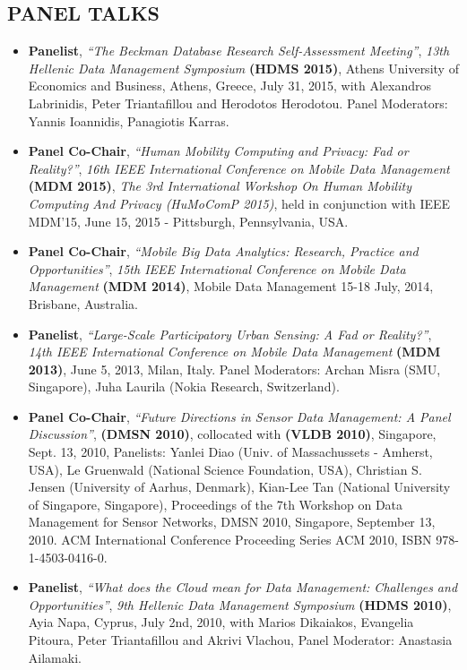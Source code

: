 \documentclass[10pt]{article}
\begin{document}
\subsection*{\bf PANEL TALKS}
\begin{itemize}
\setlength{\itemsep}{0.10ex}
%
\item  {\bf Panelist}, {\em ``The Beckman Database Research Self-Assessment Meeting''},
{\em 13th Hellenic Data Management Symposium} {\bf (HDMS 2015)}, Athens University of Economics and Business, Athens, Greece, July 31, 2015, with Alexandros Labrinidis, Peter Triantafillou and Herodotos Herodotou. Panel Moderators: Yannis Ioannidis, Panagiotis Karras.
%
\item  {\bf Panel Co-Chair}, {\em ``Human Mobility Computing and Privacy: Fad or Reality?''},
{\em 16th IEEE International Conference on Mobile Data Management} {\bf (MDM 2015)},
{\em The 3rd International Workshop On Human Mobility Computing And Privacy (HuMoComP 2015)},
held in conjunction with IEEE MDM'15, June 15, 2015 - Pittsburgh, Pennsylvania, USA.
%
\item  {\bf Panel Co-Chair}, {\em ``Mobile Big Data Analytics: Research, Practice and Opportunities''},
{\em 15th IEEE International Conference on Mobile Data Management} {\bf (MDM 2014)}, Mobile Data Management
15-18 July, 2014, Brisbane, Australia.
%
\item  {\bf Panelist}, {\em ``Large-Scale Participatory Urban Sensing: A Fad or Reality?''},  
{\em 14th IEEE International Conference on Mobile Data Management}  {\bf (MDM 2013)}, June 5, 2013, Milan, Italy. Panel Moderators:
Archan Misra (SMU, Singapore), Juha Laurila (Nokia Research, Switzerland).
%
\item  {\bf Panel Co-Chair}, {\em ``Future Directions in Sensor Data Management: A Panel Discussion''}, {\bf (DMSN 2010)}, collocated with {\bf (VLDB 2010)}, Singapore, Sept. 13, 2010, Panelists: Yanlei Diao (Univ. of Massachussets - Amherst, USA), Le Gruenwald (National Science Foundation, USA), Christian S. Jensen (University of Aarhus, Denmark), Kian-Lee Tan (National University of Singapore, Singapore), Proceedings of the 7th Workshop on Data Management for Sensor Networks, DMSN 2010, Singapore, September 13, 2010. ACM International Conference Proceeding Series ACM 2010, ISBN 978-1-4503-0416-0.
%
\item  {\bf Panelist}, {\em ``What does the Cloud mean for Data Management: Challenges and Opportunities''},  
{\em 9th Hellenic Data Management Symposium} {\bf (HDMS 2010)}, Ayia Napa, Cyprus, July 2nd, 2010, with Marios Dikaiakos, Evangelia Pitoura, Peter Triantafillou and Akrivi Vlachou, Panel Moderator: Anastasia Ailamaki.
\end{itemize}
\end{document}
